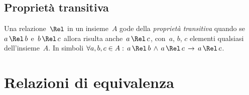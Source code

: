\subsection{Proprietà transitiva}
%
%
%
% 
% 

\begin{definizione}
Una relazione~$\Rel$ in un insieme~$A$ gode della \emph{proprietà transitiva} quando se~$a \,\Rel\, b$ e~$b \,\Rel\, c$
allora risulta anche~$a \,\Rel\, c$, con~$a$, $b$, $c$ elementi qualsiasi dell'insieme~$A$.
In simboli $\forall a, b, c \in A:\, a\, \Rel\, b\, \wedge\, a\,\Rel\,c\,\rightarrow\,a\,\Rel\,c$.
\end{definizione}

\ovalbox{\risolvii \ref{ese:7.22}, \ref{ese:7.23}, \ref{ese:7.24}, \ref{ese:7.25}}
\pagebreak
\section{Relazioni di equivalenza}

